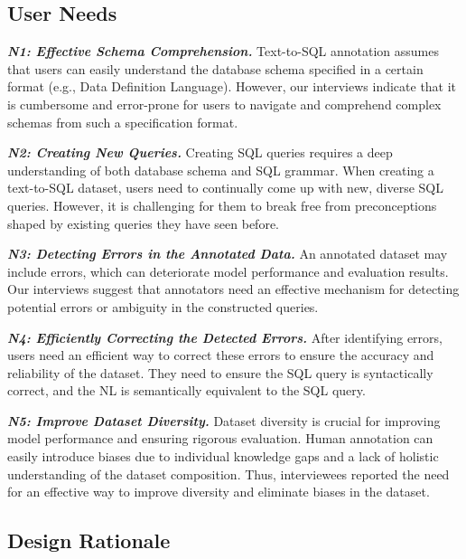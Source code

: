 \subsection{User Needs}
\label{sec:user_needs}

\noindent \textbf{\textit{N1: Effective Schema Comprehension.}} 
Text-to-SQL annotation assumes that users can easily understand the database schema specified in a certain format (e.g., Data Definition Language). However, our interviews indicate that it is cumbersome and error-prone for users to navigate and comprehend complex schemas from such a specification format.



\noindent \textbf{\textit{N2: Creating New Queries.}}
Creating SQL queries requires a deep understanding of both database schema and SQL grammar. When creating a text-to-SQL dataset, users need to continually come up with new, diverse SQL queries. However, it is challenging for them to break free from preconceptions shaped by existing queries they have seen before.

\noindent \textbf{\textit{N3: Detecting Errors in the Annotated Data.}} 
An annotated dataset may include errors, which can deteriorate model performance and evaluation results.
Our interviews suggest that annotators need an effective mechanism for detecting potential errors or ambiguity in the constructed queries.


\noindent \textbf{\textit{N4: Efficiently Correcting the Detected Errors.}} After identifying errors, users need an efficient way to correct these errors to ensure the accuracy and reliability of the dataset. They need to ensure the SQL query is syntactically correct, and the NL is semantically equivalent to the SQL query.


\noindent \textbf{\textit{N5: Improve Dataset Diversity.}}
Dataset diversity is crucial for improving model performance and ensuring rigorous evaluation.
Human annotation can easily introduce biases due to individual knowledge gaps and a lack of holistic understanding of the dataset composition. 
Thus, interviewees reported the need for an effective way to improve diversity and eliminate biases in the dataset. 




\subsection{Design Rationale}
\label{sec:design}


